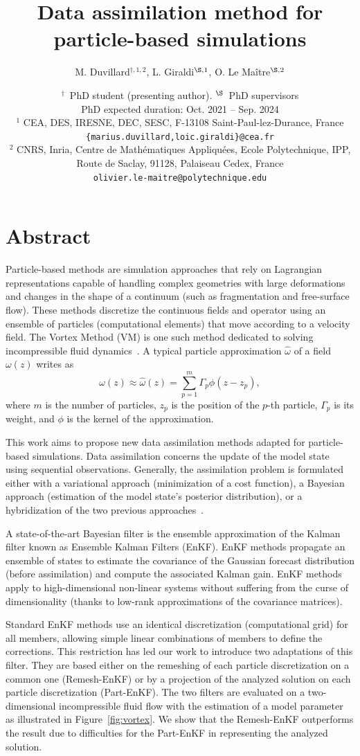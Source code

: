 \documentclass[a4paper,10pt,oneside]{article}
\title{%
  Data assimilation method for particle-based simulations} %
\author{%
  M. Duvillard${}^{\dagger,1,2}$, %
  L. Giraldi${}^{\S,1}$, %
  O. Le Maître${}^{\S,2}$}%
\date{\medskip%
  \small %
  ${}^\dagger$\ PhD student (presenting author). \quad ${}^{\S}$\ PhD supervisors\\[5pt]
  PhD expected duration: {Oct. 2021 -- Sep. 2024}\\[15pt]
  ${}^1$  CEA, DES, IRESNE, DEC, SESC, F-13108 Saint-Paul-lez-Durance, France\\
  \texttt{\{marius.duvillard,loic.giraldi\}@cea.fr}\\[4pt]
  ${}^2$ CNRS, Inria, Centre de Mathématiques Appliquées, Ecole Polytechnique, IPP, Route de Saclay, 91128, Palaiseau Cedex, France\\
  \texttt{olivier.le-maitre@polytechnique.edu}}
\begin{document}
\maketitle

\thispagestyle{fancy}

\section*{Abstract}

Particle-based methods are simulation approaches that rely on Lagrangian representations capable of handling complex geometries with large deformations and changes in the shape of a continuum (such as fragmentation and free-surface flow).
These methods discretize the continuous fields and operator using an ensemble of particles (computational elements) that move according to a velocity field. The Vortex Method (VM) is one such method dedicated to solving incompressible fluid dynamics~\cite{book_vortex}. A typical particle approximation $\hat{\omega}$ of a field $\omega(z)$ writes as
\[
  \omega(z) \approx \hat{\omega} (z) = \sum_{p=1}^m \Gamma_p \phi(z-z_p),
\]
where $m$ is the number of particles, $z_p$ is the position of the $p$-th particle, $\Gamma_p$ is its weight, and $\phi$ is the kernel of the approximation.

This work aims to propose new data assimilation methods adapted for particle-based simulations. Data assimilation concerns the update of the model state using sequential observations. Generally, the assimilation problem is formulated either with a variational approach (minimization of a cost function), a Bayesian approach (estimation of the model state's posterior distribution), or a hybridization of the two previous approaches~\cite{evensen_data_2022}.

A state-of-the-art Bayesian filter is the ensemble approximation of the Kalman filter known as Ensemble Kalman Filters (EnKF). EnKF methods propagate an ensemble of states to estimate the covariance of the Gaussian forecast distribution (before assimilation) and compute the associated Kalman gain. EnKF methods apply to high-dimensional non-linear systems without suffering from the curse of dimensionality (thanks to low-rank approximations of the covariance matrices).

Standard EnKF methods use an identical discretization (computational grid) for all members, allowing simple linear combinations of members to define the corrections. This restriction has led our work to introduce two adaptations of this filter. They are based either on the remeshing of each particle discretization on a common one (Remesh-EnKF) or by a projection of the analyzed solution on each particle discretization (Part-EnKF). The two filters are evaluated on a two-dimensional incompressible fluid flow with the estimation of a model parameter as illustrated in Figure~\ref{fig:vortex}. We show that the Remesh-EnKF outperforms the result due to difficulties for the Part-EnKF in representing the analyzed solution.
\end{document}
